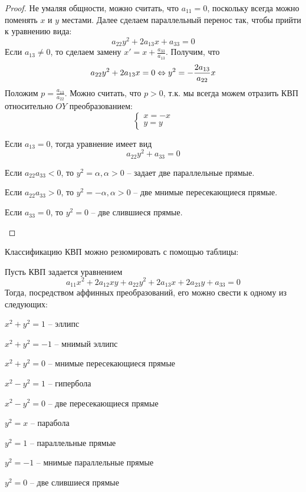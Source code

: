 \begin{proof}
	Не умаляя общности, можно считать, что $a_{11} = 0$, поскольку всегда можно поменять $x$ и $y$ местами.
	Далее сделаем параллельный перенос так, чтобы прийти к уравнению вида:
	\[a_{22} y^2 + 2a_{13} x + a_{33} = 0\]
	Если $a_{13} \neq 0$, то сделаем замену $x' = x + \frac{a_{33}}{a_{13}}$. Получим, что
	\[a_{22} y^2 + 2a_{13} x = 0 \Leftrightarrow y^2 = - \frac{2a_{13}}{a_{22}}x\]
	Положим $p = \frac{a_{13}}{a_{22}}$. Можно считать, что $p > 0$, т.к. мы всегда можем отразить КВП относительно $OY$ преобразованием:
	\[\begin{cases}
		x = -x \\
		y = y
	\end{cases}\]

	Если $a_{13} = 0$, тогда уравнение имеет вид
	\[a_{22} y^2 + a_{33} = 0\]
	\begin{MyList}
		\item Если $a_{22} a_{33} < 0$, то $y^2 = \alpha, \alpha > 0$ -- задает две параллельные прямые.
		\item Если $a_{22} a_{33} > 0$, то $y^2 = -\alpha, \alpha > 0$ -- две мнимые пересекающиеся прямые.
		\item Если $a_{33} = 0$, то $y^2 = 0$ -- две слившиеся прямые. 
	\end{MyList} 
\end{proof}

\begin{Rem}
	Классификацию КВП можно резюмировать с помощью таблицы:
	\begin{figure}[H]
		\centering
		\fontsize{6pt}{2pt}
		\def\svgwidth{.9\columnwidth}
		
	\end{figure}
\end{Rem}

\begin{Thm}
	Пусть КВП задается уравнением
	\[a_{11} x^2 + 2a_{12} xy + a_{22} y^2 + 2a_{13}x + 2a_{23}y + a_{33} = 0\]
	Тогда, посредством аффинных преобразований, его можно свести к одному из следующих:
	\begin{MyList}
		\item $x^2 + y^2 = 1$ -- эллипс
		\item $x^2 + y^2 = -1$ -- мнимый эллипс
		\item $x^2 + y^2 = 0$ -- мнимые пересекающиеся прямые
		\item $x^2 - y^2 = 1$ -- гипербола
		\item $x^2 - y^2 = 0$ -- две пересекающиеся прямые
		\item $y^2 = x$ -- парабола
		\item $y^2 = 1$ -- параллельные прямые
		\item $y^2 = -1$ -- мнимые параллельные прямые
		\item $y^2 = 0$ -- две слившиеся прямые
	\end{MyList}
\end{Thm}

